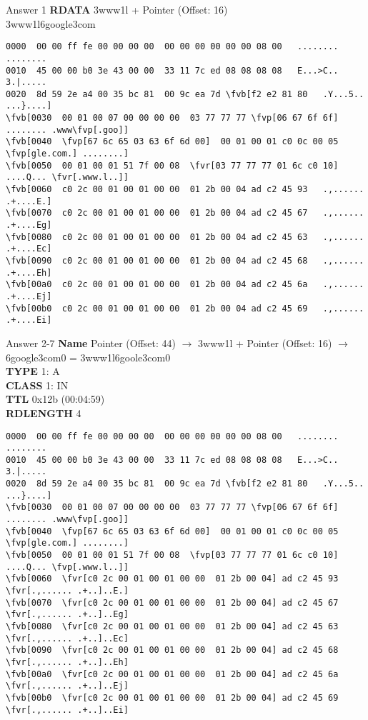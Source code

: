 \documentclass{beamer}
\newcommand*{\fvr}[1]{\textcolor{red}{#1}}
\newcommand*{\fvb}[1]{\textcolor{blue}{#1}}
\newcommand*{\fvp}[1]{\textcolor{purple}{#1}}
\begin{document}
  \begin{frame}[fragile]{\mytitle}{Answer 1}
    \textbf{RDATA} 3www1l + Pointer (Offset: 16)\\
    3www1l6google3com
    \vfill
    \tiny
    \begin{Verbatim}[commandchars=\\\[\]]
0000  00 00 ff fe 00 00 00 00  00 00 00 00 00 00 08 00   ........ ........
0010  45 00 00 b0 3e 43 00 00  33 11 7c ed 08 08 08 08   E...>C.. 3.|.....
0020  8d 59 2e a4 00 35 bc 81  00 9c ea 7d \fvb[f2 e2 81 80   .Y...5.. ...}....]
\fvb[0030  00 01 00 07 00 00 00 00  03 77 77 77 \fvp[06 67 6f 6f]   ........ .www\fvp[.goo]]
\fvb[0040  \fvp[67 6c 65 03 63 6f 6d 00]  00 01 00 01 c0 0c 00 05   \fvp[gle.com.] ........]
\fvb[0050  00 01 00 01 51 7f 00 08  \fvr[03 77 77 77 01 6c c0 10]   ....Q... \fvr[.www.l..]]
\fvb[0060  c0 2c 00 01 00 01 00 00  01 2b 00 04 ad c2 45 93   .,...... .+....E.]
\fvb[0070  c0 2c 00 01 00 01 00 00  01 2b 00 04 ad c2 45 67   .,...... .+....Eg]
\fvb[0080  c0 2c 00 01 00 01 00 00  01 2b 00 04 ad c2 45 63   .,...... .+....Ec]
\fvb[0090  c0 2c 00 01 00 01 00 00  01 2b 00 04 ad c2 45 68   .,...... .+....Eh]
\fvb[00a0  c0 2c 00 01 00 01 00 00  01 2b 00 04 ad c2 45 6a   .,...... .+....Ej]
\fvb[00b0  c0 2c 00 01 00 01 00 00  01 2b 00 04 ad c2 45 69   .,...... .+....Ei]
    \end{Verbatim}
\end{frame}


  \begin{frame}[fragile]{\mytitle}{Answer 2-7}
    \textbf{Name} Pointer (Offset: 44) $\rightarrow$ 3www1l + Pointer (Offset: 16) $\rightarrow$ 6google3com0 = 3www1l6goole3com0\\
    \textbf{TYPE} 1: A\\
    \textbf{CLASS} 1: IN\\
    \textbf{TTL} 0x12b (00:04:59)\\
    \textbf{RDLENGTH} 4\\
    \vfill
    \tiny
    \begin{Verbatim}[commandchars=\\\[\]]
0000  00 00 ff fe 00 00 00 00  00 00 00 00 00 00 08 00   ........ ........
0010  45 00 00 b0 3e 43 00 00  33 11 7c ed 08 08 08 08   E...>C.. 3.|.....
0020  8d 59 2e a4 00 35 bc 81  00 9c ea 7d \fvb[f2 e2 81 80   .Y...5.. ...}....]
\fvb[0030  00 01 00 07 00 00 00 00  03 77 77 77 \fvp[06 67 6f 6f]   ........ .www\fvp[.goo]]
\fvb[0040  \fvp[67 6c 65 03 63 6f 6d 00]  00 01 00 01 c0 0c 00 05   \fvp[gle.com.] ........]
\fvb[0050  00 01 00 01 51 7f 00 08  \fvp[03 77 77 77 01 6c c0 10]   ....Q... \fvp[.www.l..]]
\fvb[0060  \fvr[c0 2c 00 01 00 01 00 00  01 2b 00 04] ad c2 45 93   \fvr[.,...... .+..]..E.]
\fvb[0070  \fvr[c0 2c 00 01 00 01 00 00  01 2b 00 04] ad c2 45 67   \fvr[.,...... .+..]..Eg]
\fvb[0080  \fvr[c0 2c 00 01 00 01 00 00  01 2b 00 04] ad c2 45 63   \fvr[.,...... .+..]..Ec]
\fvb[0090  \fvr[c0 2c 00 01 00 01 00 00  01 2b 00 04] ad c2 45 68   \fvr[.,...... .+..]..Eh]
\fvb[00a0  \fvr[c0 2c 00 01 00 01 00 00  01 2b 00 04] ad c2 45 6a   \fvr[.,...... .+..]..Ej]
\fvb[00b0  \fvr[c0 2c 00 01 00 01 00 00  01 2b 00 04] ad c2 45 69   \fvr[.,...... .+..]..Ei]
    \end{Verbatim}
\end{frame}
  
\end{document}
